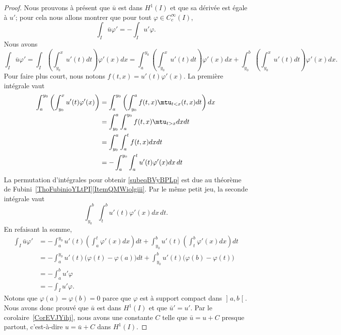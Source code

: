 \begin{proof}
	Nous prouvons à présent que \( \bar u\) est dans \( H^1(I)\) et que sa dérivée est égale à \( u'\); pour cela nous allons montrer que pour tout \( \varphi\in  C^{\infty}_c(I)\),
	\begin{equation}
		\int_I\bar u\varphi'=-\int_Iu'\varphi.
	\end{equation}
	Nous avons
	\begin{equation}
		\int_I\bar u\varphi'=\int_I\left( \int_{y_0}^xu'(t)dt\right)\varphi'(x)dx
		=\int_{a}^{y_0}\left( \int_{y_0}^xu'(t)dt\right)\varphi'(x)dx+\int_{y_0}^b\left( \int_{y_0}^xu'(t)dt\right)\varphi'(x)dx.
	\end{equation}
	Pour faire plus court, nous notons \( f(t,x)=u'(t)\varphi'(x)\). La première intégrale vaut
	\begin{subequations}
		\begin{align}
			\int_a^{y_0}\left( \int_{y_0}^x u'(t)\varphi'(x) \right) & =\int_a^{y_0}\left(\int_{y_0}^af(t,x)\mtu_{t<x}(t,x)dt\right)dx     \\
			                                                         & =\int_{y_0}^a\int_a^{y_0}f(t,x)\mtu_{t>x}dxdt  \label{subeqBVyBPLp} \\
			                                                         & =\int_{y_0}^a\int_a^tf(t,x)dxdt                                     \\
			                                                         & =-\int_a^{y_0}\int_a^tu'(t)\varphi'(x)dx\,dt
		\end{align}
	\end{subequations}
	La permutation d'intégrales pour obtenir \eqref{subeqBVyBPLp} est due au théorème de Fubini~\ref{ThoFubinioYLtPI}\ref{ItemQMWiolgiii}. Par le même petit jeu, la seconde intégrale vaut
	\begin{equation}
		\int_{y_0}^b\int_t^b u'(t)\varphi'(x)dx\,dt.
	\end{equation}
	En refaisant la somme,
	\begin{subequations}
		\begin{align}
			\int_I\bar u\varphi'
			 & =-\int_a^{y_0}u'(t)\left( \int_a^t\varphi'(x)dx \right)dt+\int_{y_0}^bu'(t)\left( \int_t^b\varphi'(x)dx \right)dt \\
			 & =-\int_a^{y_0}u'(t)\big( \varphi(t)-\varphi(a) \big)dt+\int_{y_0}^bu'(t)\big( \varphi(b)-\varphi(t) \big)         \\
			 & =-\int_a^bu'\varphi                                                                                               \\
			 & =-\int_Iu'\varphi.
		\end{align}
	\end{subequations}
	Notons que \( \varphi(a)=\varphi(b)=0\) parce que \( \varphi\) est à support compact dans \( \mathopen] a , b \mathclose[\). Nous avons donc prouvé que \( \bar u\) est dans \( H^1(I)\) et que \( \bar u'=u'\). Par le corolaire~\ref{CorEVJYihj}, nous avons une constante \( C\) telle que \( \bar u=u+C\) presque partout, c'est-à-dire \( u=\bar u +C\) dans \( H^1(I)\).


\end{proof}
